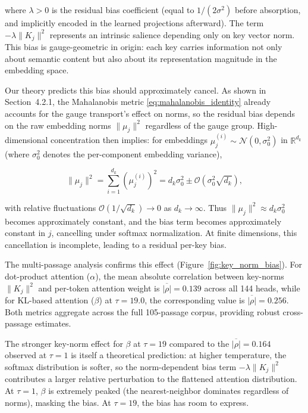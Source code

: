 \documentclass[twoside,11pt]{article}
\begin{document}
where $\lambda > 0$ is the residual bias coefficient (equal to $1/(2\sigma^2)$ before absorption, and implicitly encoded in the learned projections afterward). The term $-\lambda\|K_j\|^2$ represents an intrinsic salience depending only on key vector norm. This bias is gauge-geometric in origin: each key carries information not only about semantic content but also about its representation magnitude in the embedding space.

Our theory predicts this bias should approximately cancel. As shown in Section~4.2.1, the Mahalanobis metric \eqref{eq:mahalanobis_identity} already accounts for the gauge transport's effect on norms, so the residual bias depends on the raw embedding norms $\|\mu_j\|^2$ regardless of the gauge group. High-dimensional concentration then implies: for embeddings $\mu_j^{(i)} \sim \mathcal{N}(0, \sigma_0^2)$ in $\mathbb{R}^{d_k}$ (where $\sigma_0^2$ denotes the per-component embedding variance),

\begin{equation}
\|\mu_j\|^2 = \sum_{i=1}^{d_k} (\mu_j^{(i)})^2 = d_k\sigma_0^2 \pm \mathcal{O}(\sigma_0^2\sqrt{d_k}),
\end{equation}

with relative fluctuations $\mathcal{O}(1/\sqrt{d_k}) \to 0$ as $d_k \to \infty$. Thus $\|\mu_j\|^2 \approx d_k\sigma_0^2$ becomes approximately constant, and the bias term becomes approximately constant in $j$, cancelling under softmax normalization. At finite dimensions, this cancellation is incomplete, leading to a residual per-key bias.

The multi-passage analysis confirms this effect (Figure~\ref{fig:key_norm_bias}). For dot-product attention ($\alpha$), the mean absolute correlation between key-norms $\|K_j\|^2$ and per-token attention weight is $\overline{|\rho|} = 0.139$ across all 144 heads, while for KL-based attention ($\beta$) at $\tau = 19.0$, the corresponding value is $\overline{|\rho|} = 0.256$. Both metrics aggregate across the full 105-passage corpus, providing robust cross-passage estimates.

The stronger key-norm effect for $\beta$ at $\tau = 19$ compared to the $\overline{|\rho|} = 0.164$ observed at $\tau = 1$ is itself a theoretical prediction: at higher temperature, the softmax distribution is softer, so the norm-dependent bias term $-\lambda\|K_j\|^2$ contributes a larger relative perturbation to the flattened attention distribution. At $\tau = 1$, $\beta$ is extremely peaked (the nearest-neighbor dominates regardless of norms), masking the bias. At $\tau = 19$, the bias has room to express.
\end{document}
